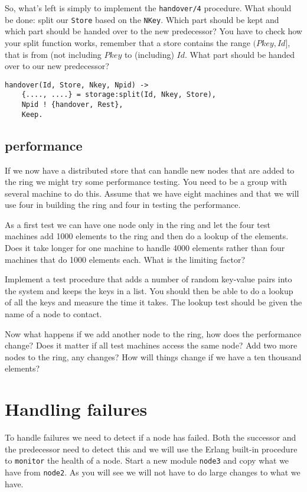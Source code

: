 \documentclass[a4paper,11pt]{article}
\begin{document}
So, what's left is simply to implement the {\tt handover/4}
procedure. What should be done: split our {\tt Store} based on the
{\tt NKey}. Which part should be kept and which part should be handed
over to the new predecessor? You have to check how your split function
works, remember that a store contains the range $(Pkey, Id]$, that is
from (not including $Pkey$ to (including) $Id$. What part should be
handed over to our new predecessor?

\begin{verbatim}
handover(Id, Store, Nkey, Npid) ->
    {...., ....} = storage:split(Id, Nkey, Store),
    Npid ! {handover, Rest},
    Keep.
\end{verbatim}

\subsection{performance}

If we now have a distributed store that can handle new nodes that are
added to the ring we might try some performance testing. You need to
be a group with several machine to do this. Assume that we have eight
machines and that we will use four in building the ring and four in
testing the performance. 

As a first test we can have one node only in the ring and let the four
test machines add 1000 elements to the ring and then do a lookup of
the elements. Does it take longer for one machine to handle 4000
elements rather than four machines that do 1000 elements each. What
is the limiting factor?

Implement a test procedure that adds a number of random key-value
pairs into the system and keeps the keys in a list. You should then be
able to do a lookup of all the keys and measure the time it takes. The 
lookup test should be given the name of a node to contact.

Now what happens if we add another node to the ring, how does the
performance change? Does it matter if all test machines access the same
node? Add two more nodes to the ring, any changes? How will things
change if we have a ten thousand elements?


\section{Handling failures}

To handle failures we need to detect if a node has failed. Both the
successor and the predecessor need to detect this and we will use the
Erlang built-in procedure to {\tt monitor} the health of a node. Start a
new module {\tt node3} and copy what we have from {\tt node2}. As you
will see we will not have to do large changes to what we have.
\end{document}
